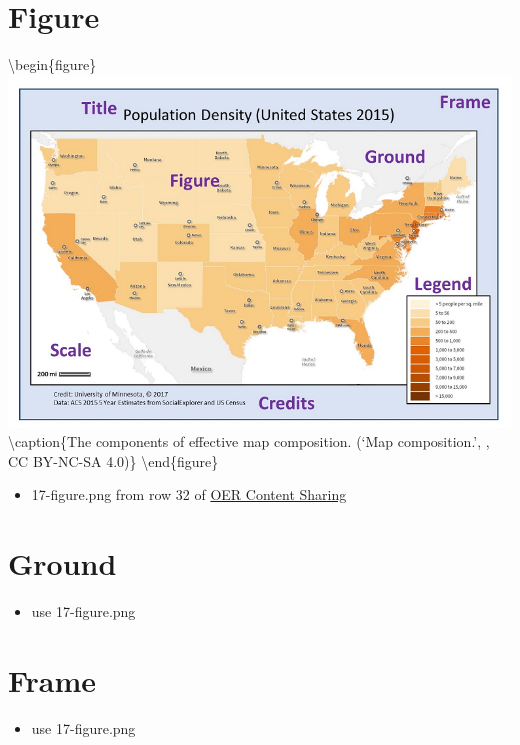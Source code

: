 \documentclass[
]{book}
\providecommand{\tightlist}{%
  \setlength{\itemsep}{0pt}\setlength{\parskip}{0pt}}
\begin{document}
\hypertarget{figure}{%
\section{Figure}\label{figure}}

\textbackslash begin\{figure\}
\includegraphics[width=0.8\linewidth]{images/17-figure} \textbackslash caption\{The components of effective map composition. (`Map composition.', \citet{manson_composition_2017}, CC BY-NC-SA 4.0)\}\label{fig:17-figure}
\textbackslash end\{figure\}

\begin{itemize}
\tightlist
\item
  17-figure.png from row 32 of \href{https://docs.google.com/spreadsheets/d/1LqzXn00wMeIjHWstNT3tMImNDZirLGc3g72jFOQc_8I/edit\#gid=817407192}{OER Content Sharing}
\end{itemize}

\hypertarget{ground}{%
\section{Ground}\label{ground}}

\begin{itemize}
\tightlist
\item
  use 17-figure.png
\end{itemize}

\hypertarget{frame}{%
\section{Frame}\label{frame}}

\begin{itemize}
\tightlist
\item
  use 17-figure.png
\end{itemize}
\end{document}
